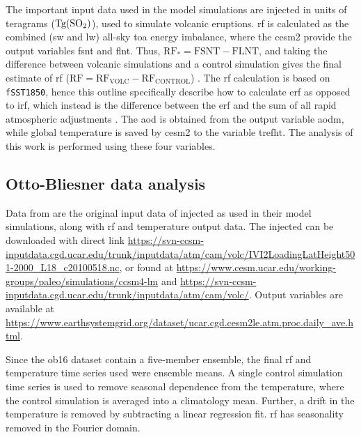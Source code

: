 \documentclass{ametsocV6.1}
\newcommand{\iso}[1][i]{{#1}njected \ce{SO2}}
\begin{document}
The important input data used in the model simulations are \iso{} in units of teragrams
(\(\si{\tera\gram(\ce{SO2})}\)), used to simulate volcanic eruptions. \gls{rf} is
calculated as the combined (\gls{sw} and \gls{lw}) all-sky \gls{toa} energy imbalance,
where the \gls{cesm2} provide the output variables \gls{fsnt} and \gls{flnt}. Thus,
\(\mathrm{RF_*}= \mathrm{FSNT} - \mathrm{FLNT}\), and taking the difference between
volcanic simulations and a control simulation gives the final estimate of \gls{rf}
(\(\mathrm{RF}=\mathrm{RF_{VOLC}}-\mathrm{RF_{CONTROL}}\)) \citep{marshall2020}. The
\gls{rf} calculation is based on \texttt{fSST1850}, hence this outline specifically
describe how to calculate \gls{erf} as opposed to \gls{irf}, which instead is the
difference between the \gls{erf} and the sum of all rapid atmospheric adjustments
\citep{marshall2020,smith2018}. The \gls{aod} is obtained from the output variable
\gls{aodm}, while global temperature is saved by \gls{cesm2} to the variable
\gls{trefht}. The analysis of this work is performed using these four variables.

\appendix[B]


\subsection{Otto-Bliesner data analysis}\label{ap:ob16}

Data from \citet{ottobliesner2016} are the original input data of \iso{} as used in
their model simulations, along with \gls{rf} and temperature output data. The \iso{} can
be downloaded with direct link
\url{https://svn-ccsm-inputdata.cgd.ucar.edu/trunk/inputdata/atm/cam/volc/IVI2LoadingLatHeight501-2000_L18_c20100518.nc},
or found at \url{https://www.cesm.ucar.edu/working-groups/paleo/simulations/ccsm4-lm}
and \url{https://svn-ccsm-inputdata.cgd.ucar.edu/trunk/inputdata/atm/cam/volc/}. Output
variables are available at
\url{https://www.earthsystemgrid.org/dataset/ucar.cgd.cesm2le.atm.proc.daily_ave.html}.

Since the \gls{ob16} dataset contain a five-member ensemble, the final \gls{rf} and
temperature time series used were ensemble means. A single control simulation time
series is used to remove seasonal dependence from the temperature, where the control
simulation is averaged into a climatology mean. Further, a drift in the temperature is
removed by subtracting a linear regression fit. \gls{rf} has seasonality removed in the
Fourier domain.
\end{document}
